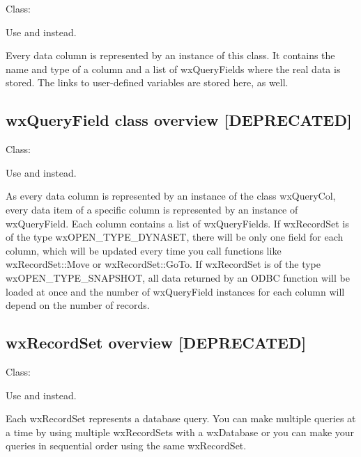 Class: 


Use  and  instead.

Every data column is represented by an instance of this class.
It contains the name and type of a column and a list of wxQueryFields where
the real data is stored. The links to user-defined variables are stored
here, as well.



\subsection{wxQueryField class overview [DEPRECATED]}\label{wxqueryfieldoverview}

Class: 


Use  and  instead.

As every data column is represented by an instance of the class wxQueryCol,
every data item of a specific column is represented by an instance of
wxQueryField. Each column contains a list of wxQueryFields. If wxRecordSet is
of the type wxOPEN\_TYPE\_DYNASET, there will be only one field for each column,
which will be updated every time you call functions like wxRecordSet::Move
or wxRecordSet::GoTo. If wxRecordSet is of the type wxOPEN\_TYPE\_SNAPSHOT,
all data returned by an ODBC function will be loaded at once and the number
of wxQueryField instances for each column will depend on the number of records.



\subsection{wxRecordSet overview [DEPRECATED]}\label{wxrecordsetoverview}

Class: 


Use  and  instead.

Each wxRecordSet represents a database query. You can make multiple queries
at a time by using multiple wxRecordSets with a wxDatabase or you can make
your queries in sequential order using the same wxRecordSet.

